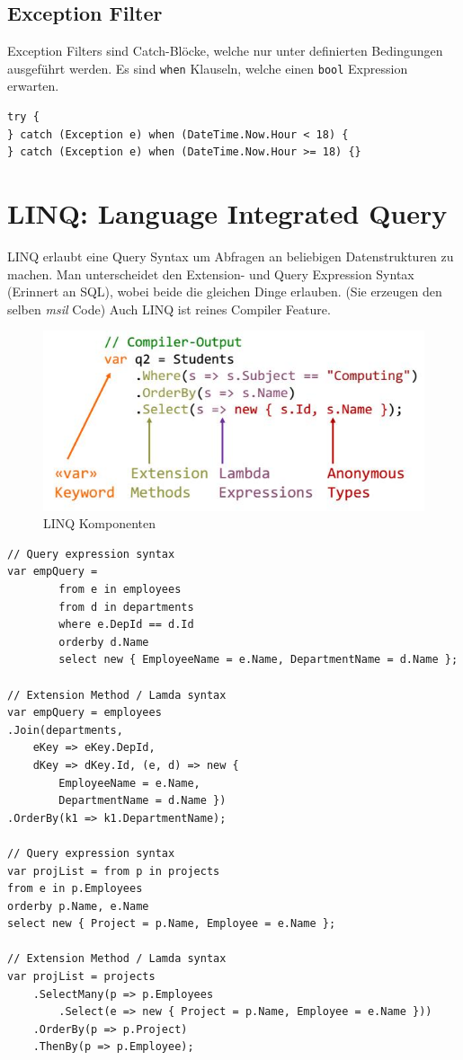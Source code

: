 \documentclass[
a4paper,
oneside,
10pt,
fleqn,
headsepline,
toc=listofnumbered, 
bibliography=totocnumbered]{scrartcl}
\let\stdsection\section
\renewcommand\section{\clearpage\stdsection}
\begin{document}
\subsection{Exception Filter}
Exception Filters sind Catch-Blöcke, welche nur unter definierten Bedingungen ausgeführt werden. Es sind \lstinline|when| Klauseln, welche einen \lstinline|bool| Expression erwarten.
\begin{lstlisting}
try {
} catch (Exception e) when (DateTime.Now.Hour < 18) {
} catch (Exception e) when (DateTime.Now.Hour >= 18) {}
\end{lstlisting}


\section{LINQ: Language Integrated Query}
LINQ erlaubt eine Query Syntax um Abfragen an beliebigen Datenstrukturen zu machen. Man unterscheidet den Extension- und Query Expression Syntax (Erinnert an SQL), wobei beide die gleichen Dinge erlauben. (Sie erzeugen den selben \textit{msil} Code) Auch LINQ ist reines Compiler Feature.

\begin{figure}[h]
\centering
\includegraphics[width=0.7\linewidth]{images/linq_components}
\caption{LINQ Komponenten}
\label{fig:linqcomponents}
\end{figure}

\begin{lstlisting}
// Query expression syntax
var empQuery =
        from e in employees
        from d in departments
        where e.DepId == d.Id
        orderby d.Name
        select new { EmployeeName = e.Name, DepartmentName = d.Name };

// Extension Method / Lamda syntax
var empQuery = employees
.Join(departments, 
	eKey => eKey.DepId, 
	dKey => dKey.Id, (e, d) => new { 
		EmployeeName = e.Name, 
		DepartmentName = d.Name })
.OrderBy(k1 => k1.DepartmentName);

// Query expression syntax
var projList = from p in projects
from e in p.Employees
orderby p.Name, e.Name
select new { Project = p.Name, Employee = e.Name };

// Extension Method / Lamda syntax
var projList = projects
    .SelectMany(p => p.Employees
        .Select(e => new { Project = p.Name, Employee = e.Name }))
    .OrderBy(p => p.Project)
    .ThenBy(p => p.Employee);			  
\end{lstlisting}
\end{document}
